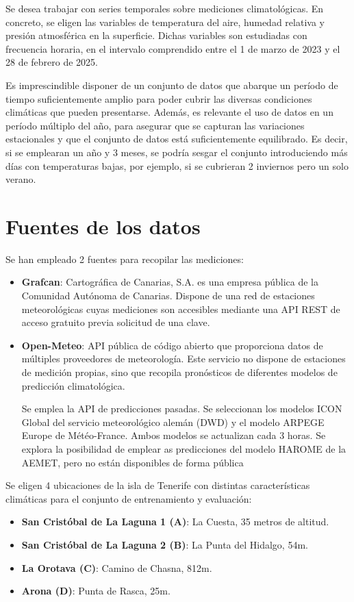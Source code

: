 
Se desea trabajar con series temporales sobre mediciones climatológicas. 
En concreto, se eligen las variables de temperatura del aire, humedad relativa y presión atmosférica en la superficie.
Dichas variables son estudiadas con frecuencia horaria, en el intervalo comprendido entre el 1 de marzo de 2023 y el 28 de febrero de 2025.

Es imprescindible disponer de un conjunto de datos que abarque un período de tiempo suficientemente amplio para poder cubrir las diversas condiciones climáticas que pueden presentarse.
Además, es relevante el uso de datos en un período múltiplo del año, para asegurar que se capturan las variaciones estacionales y que el conjunto de datos está suficientemente equilibrado.
Es decir, si se emplearan un año y 3 meses, se podría sesgar el conjunto introduciendo más días con temperaturas bajas, por ejemplo, si se cubrieran 2 inviernos pero un solo verano.

\section{Fuentes de los datos}

Se han empleado 2 fuentes para recopilar las mediciones: 
\begin{itemize}
    \item \textbf{Grafcan}: Cartográfica de Canarias, S.A. es una empresa pública de la Comunidad Autónoma de Canarias. Dispone de una red de estaciones meteorológicas cuyas
    mediciones son accesibles mediante una API REST de acceso gratuito previa solicitud de una clave\cite{grafcan_sensores}. 
    \item \textbf{Open-Meteo}: API pública de código abierto que proporciona datos de múltiples proveedores de meteorología. Este servicio no dispone de estaciones de medición
    propias, sino que recopila pronósticos de diferentes modelos de predicción climatológica. 

    Se emplea la API de predicciones pasadas\cite{open_meteo_api}. Se seleccionan los modelos ICON Global del servicio meteorológico alemán (DWD) y el modelo ARPEGE Europe de Météo-France. Ambos modelos se actualizan cada 3 horas. 
    Se explora la posibilidad de emplear as predicciones del modelo HAROME de la AEMET, pero no están disponibles de forma pública
\end{itemize}

Se eligen 4 ubicaciones de la isla de Tenerife con distintas características climáticas para el conjunto de entrenamiento y evaluación:
\begin{itemize}
    \item \textbf{San Cristóbal de La Laguna 1 (A)}: La Cuesta, 35 metros de altitud.
    \item \textbf{San Cristóbal de La Laguna 2 (B)}: La Punta del Hidalgo, 54m.
    \item \textbf{La Orotava (C)}: Camino de Chasna, 812m.
    \item \textbf{Arona (D)}: Punta de Rasca, 25m.
\end{itemize}


